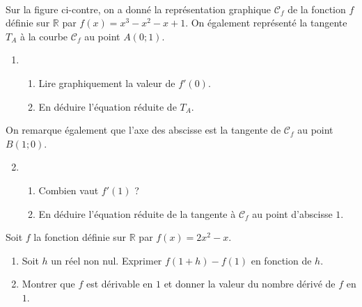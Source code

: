 \documentclass[11pt]{article}
\begin{document}
\begin{exo}~\\
  \begin{minipage}{.5\textwidth}
    Sur la figure ci-contre, on a donné la représentation graphique $\mathcal
    C_f$ de la
    fonction $f$ définie sur $\mathbb{R}$ par $f(x) = x^3-x^2-x+1$. On également
    représenté la tangente $T_A$ à la courbe $\mathcal C_f$ au point $A(0; 1)$.
    \begin{enumerate}
      \item \begin{enumerate}
          \item Lire graphiquement la valeur de $f'(0)$.
          \item En déduire l'équation réduite de $T_A$.
        \end{enumerate}
    \end{enumerate}
    On remarque également que l'axe des abscisse est la tangente de $\mathcal
    C_f$ au point $B(1; 0)$.
    \begin{enumerate}
        \setcounter{enumi}{1}
      \item \begin{enumerate}
          \item Combien vaut $f'(1)$ ?
          \item En déduire l'équation réduite de la tangente à $\mathcal C_f$ au
            point d'abscisse $1$.
        \end{enumerate}
    \end{enumerate}
  \end{minipage}
  \begin{minipage}{.5\textwidth}
\begin{center}
\end{center}
  \end{minipage}
\end{exo}

\vspace{1cm}
\setcounter{exo}{0}
\begin{exo}
  Soit $f$ la fonction définie sur $\mathbb{R}$ par $f(x) = 2x^2-x$.
  \begin{enumerate}
    \item Soit $h$ un réel non nul. Exprimer $f(1+h)-f(1)$ en fonction de $h$.
    \item Montrer que $f$ est dérivable en $1$ et donner la valeur du nombre
      dérivé de $f$ en $1$.
  \end{enumerate}
\end{exo}
\end{document}
